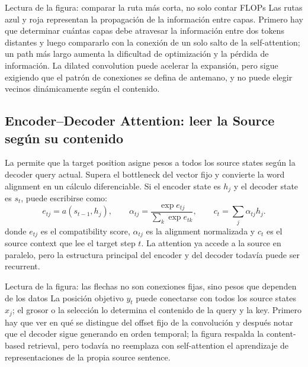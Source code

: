 
\begin{knowledgebox}{Lectura de la figura: comparar la ruta más corta, no solo contar FLOPs}
Las rutas azul y roja representan la propagación de la información entre capas. Primero hay que determinar cuántas capas debe atravesar la información entre dos tokens distantes y luego compararlo con la conexión de un solo salto de la self-attention; un path más largo aumenta la dificultad de optimización y la pérdida de información. La dilated convolution puede acelerar la expansión, pero sigue exigiendo que el patrón de conexiones se defina de antemano, y no puede elegir vecinos dinámicamente según el contenido.
\end{knowledgebox}

\subsection{Encoder--Decoder Attention: leer la Source según su contenido}

La  permite que la target position asigne pesos a todos los source states según la decoder query actual. Supera el bottleneck del vector fijo y convierte la word alignment en un cálculo diferenciable. Si el encoder state es $h_j$ y el decoder state es $s_t$, puede escribirse como:
\[
e_{tj}=a(s_{t-1},h_j),\qquad
\alpha_{tj}=\frac{\exp e_{tj}}{\sum_{k}\exp e_{tk}},\qquad
c_t=\sum_j\alpha_{tj}h_j.
\]
donde $e_{tj}$ es el compatibility score, $\alpha_{tj}$ es la alignment normalizada y $c_t$ es el source context que lee el target step $t$. La attention ya accede a la source en paralelo, pero la estructura principal del encoder y del decoder todavía puede ser recurrent.


\begin{knowledgebox}{Lectura de la figura: las flechas no son conexiones fijas, sino pesos que dependen de los datos}
La posición objetivo $y_t$ puede conectarse con todos los source states $x_j$; el grosor o la selección lo determina el contenido de la query y la key. Primero hay que ver en qué se distingue del offset fijo de la convolución y después notar que el decoder sigue generando en orden temporal; la figura respalda la content-based retrieval, pero todavía no reemplaza con self-attention el aprendizaje de representaciones de la propia source sentence.
\end{knowledgebox}


